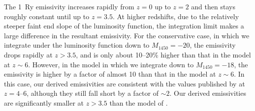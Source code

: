 \documentclass[a4paper,fleqn,usenatbib]{mnras}
\begin{document}
The 1~Ry emissivity increases rapidly from $z=0$ up to $z=2$ and then
stays roughly constant until up to $z=3.5$.  At higher redshifts, due
to the relatively steeper faint end slope of the luminosity function,
the integration limit makes a large difference in the resultant
emissivity.  For the conservative case, in which we integrate under
the luminosity function down to $M_{1450}=-20$, the emissivity drops
rapidly at $z>3.5$, and is only about 10--20\% higher than that in the
\citet{2012ApJ...746..125H} model at $z\sim 6$.  However, in the model
in which we integrate down to $M_{1450}=-18$, the emissivity is higher
by a factor of almost 10 than that in the \citet{2012ApJ...746..125H}
model at $z\sim 6$.  In this case, our derived emissivities are
consistent with the values published by \citet{2015AA...578A..83G} at
$z=4$--$6$, although they still fall short by a factor of $\sim 2$.
Our derived emissivities are significantly smaller at $z>3.5$ than the
model of \citet{2015ApJ...813L...8M}.
\end{document}
